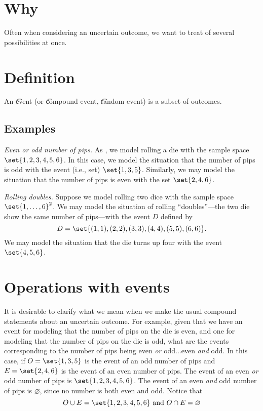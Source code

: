 
\section*{Why}

Often when considering an uncertain outcome, we want to treat of several possibilities at once.

\section*{Definition}

An \t{event} (or \t{compound event}, \t{random event}) is a subset of outcomes.

\subsection*{Examples}

\textit{Even or odd number of pips.}
As , we model rolling a die with the sample space $\set{1, 2, 3, 4, 5, 6}$.
In this case, we model the situation that the number of pips is odd with the event (i.e., set) $\set{1, 3, 5}$.
Similarly, we may model the situation that the number of pips is even with the set $\set{2, 4, 6}$.

\textit{Rolling doubles.}
Suppose we model rolling two dice with the sample space $\set{1,\dots ,6}^2$.
We may model the situation of rolling ``doubles''---the two die show the same number of pips---with the event $D$ defined by
\[
D = \set{(1,1),(2,2),(3,3),(4,4),(5,5),(6,6)}.
\]
We may model the situation that the die turns up four with the event $\set{4, 5, 6}$.

\section*{Operations with events}

It is desirable to clarify what we mean when we make the usual compound statements about an uncertain outcome.
For example, given that we have an event for modeling that the number of pips on the die is even, and one for modeling that the number of pips on the die is odd, what are the events corresponding to the number of pips being even \textit{or} odd...even \textit{and} odd.
In this case, if $O = \set{1,3,5}$ is the event of an odd number of pips and $E = \set{2,4,6}$ is the event of an even number of pips.
The event of an even \textit{or} odd number of pips is $\set{1,2,3,4,5,6}$.
The event of an even \textit{and} odd number of pips is $\varnothing$, since no number is both even and odd.
Notice that
\[
O \cup E = \set{1,2,3,4,5,6} \text{ and } O \cap  E = \varnothing
\]

